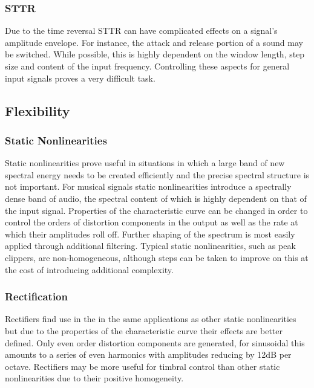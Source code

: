 		\subsubsection*{STTR}
			Due to the time reversal STTR can have complicated effects on a signal's amplitude envelope.  For
			instance, the attack and release portion of a sound may be switched. While possible, this is highly
			dependent on the window length, step size and content of the input frequency. Controlling these
			aspects for general input signals proves a very difficult task.

	\subsection{Flexibility}
	\label{sec:ExcitationEvaluation-Comparison-Flexibility}
		\subsubsection*{Static Nonlinearities}
			Static nonlinearities prove useful in situations in which a large band of new spectral energy needs
			to be created efficiently and the precise spectral structure is not important. For musical signals
			static nonlinearities introduce a spectrally dense band of audio, the spectral content of which is
			highly dependent on that of the input signal. Properties of the characteristic curve can be changed
			in order to control the orders of distortion components in the output as well as the rate at which
			their amplitudes roll off. Further shaping of the spectrum is most easily applied through
			additional filtering. Typical static nonlinearities, such as peak clippers, are non-homogeneous,
			although steps can be taken to improve on this at the cost of introducing additional complexity.
			
		\subsubsection*{Rectification}
			Rectifiers find use in the in the same applications as other static nonlinearities but due to the
			properties of the characteristic curve their effects are better defined. Only even order distortion
			components are generated, for sinusoidal this amounts to a series of even harmonics with amplitudes
			reducing by 12dB per octave. Rectifiers may be more useful for timbral control than other static
			nonlinearities due to their positive homogeneity.

